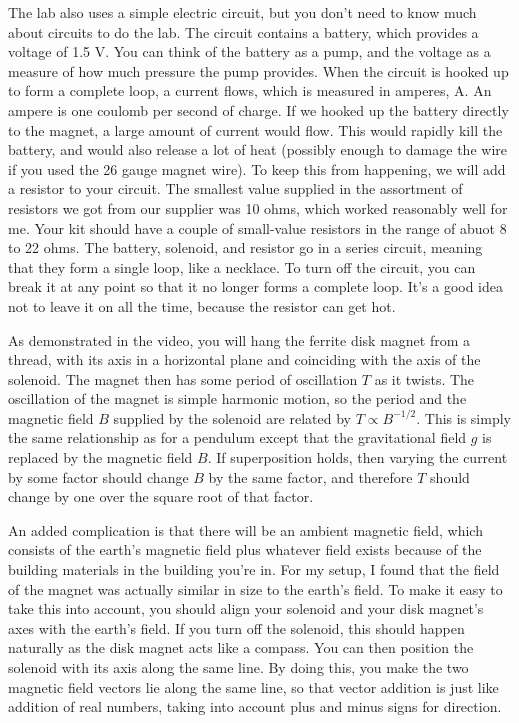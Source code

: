 The lab also uses a simple electric circuit, but you don't need to know much about circuits to do the lab.
The circuit contains a battery, which provides a voltage of 1.5 V. You can think of the battery as a pump, and the
voltage as a measure of how much pressure the pump provides. When the circuit is hooked up to form a complete loop,
a current flows, which is measured in amperes, A. An ampere is one coulomb per second of charge. If we hooked up
the battery directly to the magnet, a large amount of current would flow. This would rapidly kill the battery, and
would also release a lot of heat (possibly enough to damage the wire if you used the 26 gauge magnet wire).
To keep this from happening, we will add a resistor to your circuit. The smallest
value supplied in the assortment of resistors we got from our supplier was 10 ohms, which worked reasonably well for me.
Your kit should have a couple of small-value resistors in the range of abuot 8 to 22 ohms.
The battery, solenoid, and resistor go in a series circuit, meaning that they form a single loop, like a necklace.
To turn off the circuit, you can break it at any point so that it no longer forms a complete loop. It's a good idea
not to leave it on all the time, because the resistor can get hot.

As demonstrated in the video, you will hang the ferrite disk magnet from a thread, with its axis in a horizontal plane
and coinciding with the axis of the solenoid. The magnet then has some period of oscillation $T$ as it twists.
The oscillation of the magnet is simple harmonic motion, so the period and
the magnetic field $B$ supplied by the solenoid are related by $T\propto B^{-1/2}$.
This is simply the same relationship as for a pendulum except that the gravitational field $g$ is replaced by the magnetic field $B$.
If superposition holds, then varying the current by some factor should change $B$ by the same factor, and therefore
$T$ should change by one over the square root of that factor.

An added complication is that there will be an ambient magnetic field, which consists of the earth's magnetic field
plus whatever field exists because of the building materials in the building you're in. For my setup, I found that
the field of the magnet was actually similar in size to the earth's field. To make it easy to take this into account,
you should align your solenoid and your disk magnet's axes with the earth's field. If you turn off the solenoid, this should
happen naturally as the disk magnet acts like a compass. You can then position the solenoid with its axis along the same line.
By doing this, you make the two magnetic field vectors lie along the same line, so that vector addition is just like addition of
real numbers, taking into account plus and minus signs for direction.


